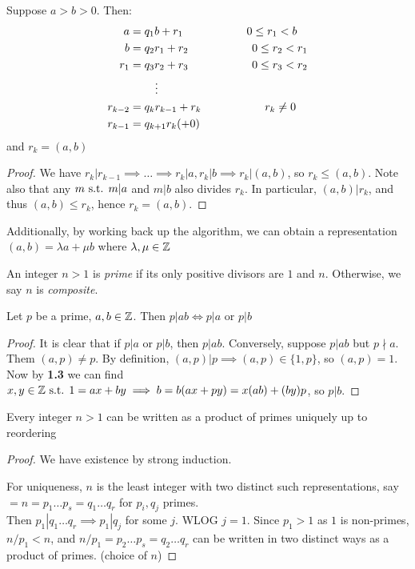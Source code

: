 \documentclass[10pt,a4paper]{article}
\begin{document}
\begin{theorem}
Suppose $a>b>0$. Then:
\begin{align*}
a &= q_1 b + r_1 \hspace{2cm} 0\leq r_1 < b\\
b &= q_2 r_1 + r_2 \hspace{2cm} 0\leq r_2 < r_1\\
r_1 &= q_3 r_2 + r_3 \hspace{2cm} 0\leq r_3 < r_2\\
&\hspace{.8cm}\vdots\\
r_{k-2} &= q_k r_{k-1} + r_k \hspace{2cm} r_k\neq 0\\
r_{k-1} &= q_{k+1} r_k (+0)
\end{align*}
and $r_k = (a,b)$
\end{theorem}
\begin{proof}
We have $r_k|r_{k-1} \implies \ldots \implies r_k|a, r_k|b \implies r_k|(a,b)$, so $r_k \leq (a,b)$. Note also that any $m \text{ s.t. } m| a$ and $m| b$ also divides $r_k$. In particular, $(a,b)|r_k$, and thus $(a,b)\leq r_k$, hence $r_k = (a,b)$.
\end{proof}
Additionally, by working back up the algorithm, we can obtain a representation $(a,b) = \lambda a + \mu b$ where $\lambda, \mu \in \mathbb{Z}$

An integer $n>1$ is \emph{prime} if its only positive divisors are $1$ and $n$. Otherwise, we say $n$ is \emph{composite}.
\begin{corollary}
Let $p$ be a prime, $a,b \in \mathbb{Z}$. Then $p|ab \iff p|a$ or $p|b$
\end{corollary}
\begin{proof}
It is clear that if $p|a$ or $p|b$, then $p|ab$. Conversely, suppose $p|ab$ but $p\nmid a$. Them $(a,p) \neq p$. By definition, $(a,p)|p \implies (a,p) \in \{1,p\}$, so $(a,p)=1$. Now by \textbf{1.3} we can find $x,y\in\mathbb{Z}\text{ s.t. } 1=ax+by \implies b = b(ax+py) = x(ab) + (by)p$, so $p|b$.
\end{proof}

\begin{theorem}
Every integer $n>1$ can be written as a product of primes uniquely up to reordering
\end{theorem}
\begin{proof}
We have existence by strong induction.

For uniqueness, $n$ is the least integer with two distinct such representations, say $=n=p_1\ldots p_s = q_1\ldots q_r$ for $p_i, q_j$ primes.\\
Then $p_1|q_1\ldots q_r \implies p_1|q_j$ for some $j$. WLOG $j=1$. Since $p_1 > 1$ as $1$ is non-primes, $n/p_1 < n$, and $n/p_1 = p_2\ldots p_s = q_2\ldots q_r$ can be written in two distinct ways as a product of primes. \contr (choice of $n$)
\end{proof}
\end{document}
